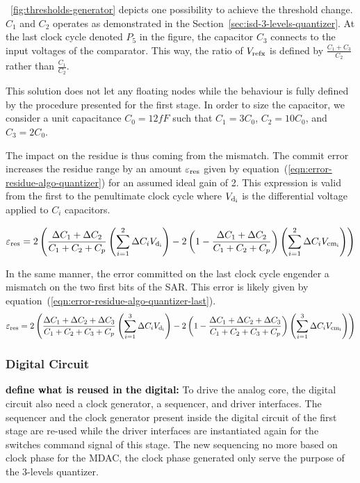 \figurename~\ref{fig:thresholds-generator} depicts one possibility to achieve the threshold change. \(C_1\) and \(C_2\) operates as demonstrated in the Section~\ref{sec:isd-3-levels-quantizer}. At the last clock cycle denoted \(P_5\) in the figure, the capacitor \(C_3\) connects to the input voltages of the comparator. This way, the ratio of \(V_{\rm refx}\) is defined by \(\frac{C_1+C_3}{C_2}\) rather than \(\frac{C_1}{C_2}\).

This solution does not let any floating nodes while the behaviour is fully defined by the procedure presented for the first stage. In order to size the capacitor, we consider a unit capacitance \(C_0 = 12 fF\) such that \(C_1 = 3 C_0\), \(C_2 = 10 C_0\), and \(C_3 = 2 C_0\).

The impact on the residue is thus coming from the mismatch. The commit error increases the residue range by an amount \(\varepsilon_{\rm res}\) given by equation~(\ref{eqn:error-residue-algo-quantizer}) for an assumed ideal gain of 2. This expression is valid from the first to the penultimate clock cycle where \(V_{\rm d_i}\) is the differential voltage applied to \(C_i\) capacitors.

\begin{equation}
	\label{eqn:error-residue-algo-quantizer}
	\varepsilon_{\rm res} = 2\left(\frac{\Delta C_1 + \Delta C_2}{C_1+C_2+C_p}\left(\sum_{i=1}^{2}{\Delta C_i V_{\rm d_i}}\right)
	- 2\left(1-\frac{\Delta C_1 + \Delta C_2}{C_1+C_2+C_p}\right)\left(\sum_{i=1}^{2}{\Delta C_i V_{\rm cm_i}}\right)\right)
\end{equation}

In the same manner, the error committed on the last clock cycle engender a mismatch on the two first bits of the SAR\@. This error is likely given by equation~(\ref{eqn:error-residue-algo-quantizer-last}).
\begin{equation}
	\label{eqn:error-residue-algo-quantizer-last}
	\varepsilon_{\rm res} = 2\left(\frac{\Delta C_1 + \Delta C_2 + \Delta C_3}{C_1+C_2+C_3+C_p}\left(\sum_{i=1}^{3}{\Delta C_i V_{\rm d_i}}\right)
	- 2\left(1-\frac{\Delta C_1 + \Delta C_2 + \Delta C_3}{C_1+C_2+C_3+C_p}\right)\left(\sum_{i=1}^{3}{\Delta C_i V_{\rm cm_i}}\right)\right)
\end{equation}

	\subsubsection{Digital Circuit}         %
\textbf{\textcolor{black}{define what is reused in the digital:}}
To drive the analog core, the digital circuit also need a clock generator, a sequencer, and driver interfaces. The sequencer and the clock generator present inside the digital circuit of the first stage are re-used while the driver interfaces are instantiated again for the switches command signal of this stage. The new sequencing no more based on clock phase for the MDAC, the clock phase generated only serve the purpose of the 3-levels quantizer.

